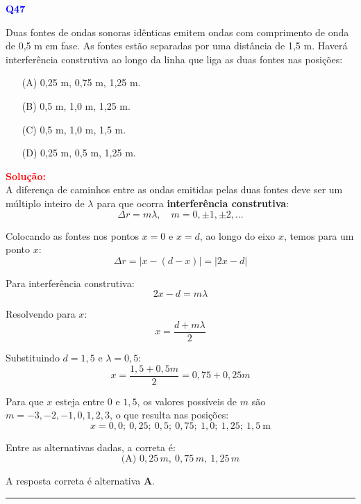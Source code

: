 \documentclass[a4paper,12pt]{article}
\begin{document}
\begin{flushleft}
\textbf{\textcolor{blue}{\Large Q47}}\\
\noindent

Duas fontes de ondas sonoras idênticas emitem ondas com
comprimento de onda de 0,5 m em fase. As fontes estão
separadas por uma distância de 1,5 m. Haverá interferência
construtiva ao longo da linha que liga as duas fontes nas
posições:

\begin{itemize}
\item[(A)] 0,25 m, 0,75 m, 1,25 m.
\item[(B)] 0,5 m, 1,0 m, 1,25 m.
\item[(C)] 0,5 m, 1,0 m, 1,5 m.
\item[(D)] 0,25 m, 0,5 m, 1,25 m.
\end{itemize}

\vspace{0.5cm}

\textcolor{red}{\textbf{Solução:}}\\

\colorbox{yellow!30}{A diferença de caminhos entre as ondas emitidas pelas duas fontes deve ser um múltiplo} 
\colorbox{yellow!30}{inteiro de \( \lambda \) para que ocorra \textbf{interferência construtiva}:}
\[
\Delta r = m\lambda, \quad m = 0, \pm1, \pm2, \dots
\]

Colocando as fontes nos pontos \( x=0 \) e \( x=d \), ao longo do eixo \( x \), temos para um ponto \( x \):
\[
\Delta r = |x - (d-x)| = |2x - d|
\]

Para interferência construtiva:
\[
2x - d = m\lambda
\]

Resolvendo para \( x \):
\[
x = \frac{d + m\lambda}{2}
\]

Substituindo \( d = 1{,}5 \) e \( \lambda = 0{,}5 \):
\[
x = \frac{1{,}5 + 0{,}5m}{2} = 0{,}75 + 0{,}25m
\]

Para que \( x \) esteja entre \( 0 \) e \( 1{,}5 \), os valores possíveis de \( m \) são \( m = -3, -2, -1, 0, 1, 2, 3 \), o que resulta nas posições:
\[
x = 0{,}0;\ 0{,}25;\ 0{,}5;\ 0{,}75;\ 1{,}0;\ 1{,}25;\ 1{,}5 \ \mathrm{m}
\]

Entre as alternativas dadas, a correta é:
\[
\boxed{\text{(A) } 0{,}25\,m,\ 0{,}75\,m,\ 1{,}25\,m}
\]


A resposta correta é alternativa \colorbox{green!50}{\textbf{A}}.
\end{flushleft}

\noindent\rule{\linewidth}{0.6pt}\\
\end{document}
